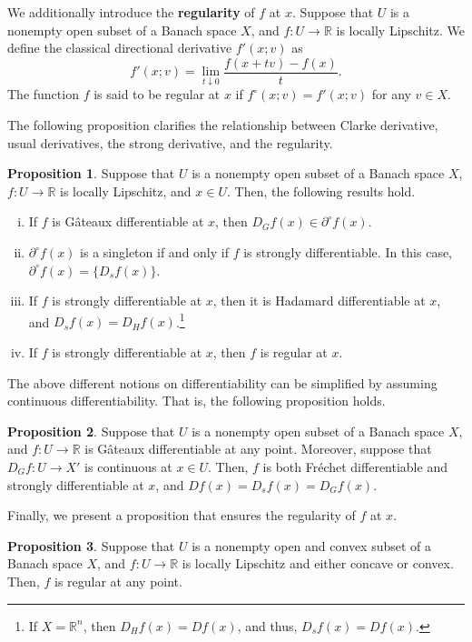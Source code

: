 \documentclass[a4paper,12pt]{article}
\theoremstyle{definition}
\newtheorem{prop}{Proposition}
\begin{document}
We additionally introduce the {\bf regularity} of $f$ at $x$. Suppose that $U$ is a nonempty open subset of a Banach space $X$, and $f:U\to \mathbb{R}$ is locally Lipschitz. We define the classical directional derivative $f'(x;v)$ as
\[f'(x;v)=\lim_{t\downarrow 0}\frac{f(x+tv)-f(x)}{t}.\]
The function $f$ is said to be regular at $x$ if $f^{\circ}(x;v)=f'(x;v)$ for any $v\in X$.

The following proposition clarifies the relationship between Clarke derivative, usual derivatives, the strong derivative, and the regularity.

\begin{prop}\label{prop5}
Suppose that $U$ is a nonempty open subset of a Banach space $X$, $f:U\to \mathbb{R}$ is locally Lipschitz, and $x\in U$. Then, the following results hold.
\begin{enumerate}[(i)]
\item If $f$ is G\^ateaux differentiable at $x$, then $D_Gf(x)\in \partial^{\circ}f(x)$.

\item $\partial^{\circ}f(x)$ is a singleton if and only if $f$ is strongly differentiable. In this case, $\partial^{\circ}f(x)=\{D_sf(x)\}$.

\item If $f$ is strongly differentiable at $x$, then it is Hadamard differentiable at $x$, and $D_sf(x)=D_Hf(x)$.\footnote{If $X=\mathbb{R}^n$, then $D_Hf(x)=Df(x)$, and thus, $D_sf(x)=Df(x)$.}

\item If $f$ is strongly differentiable at $x$, then $f$ is regular at $x$.
\end{enumerate}
\end{prop}

The above different notions on differentiability can be simplified by assuming continuous differentiability. That is, the following proposition holds.

\begin{prop}\label{prop6}
Suppose that $U$ is a nonempty open subset of a Banach space $X$, and $f:U\to \mathbb{R}$ is G\^ateaux differentiable at any point. Moreover, suppose that $D_Gf:U\to X'$ is continuous at $x\in U$. Then, $f$ is both Fr\'echet differentiable and strongly differentiable at $x$, and $Df(x)=D_sf(x)=D_Gf(x)$.
\end{prop}

Finally, we present a proposition that ensures the regularity of $f$ at $x$.

\begin{prop}\label{propx}
Suppose that $U$ is a nonempty open and convex subset of a Banach space $X$, and $f:U\to \mathbb{R}$ is locally Lipschitz and either concave or convex. Then, $f$ is regular at any point.
\end{prop}
\end{document}
